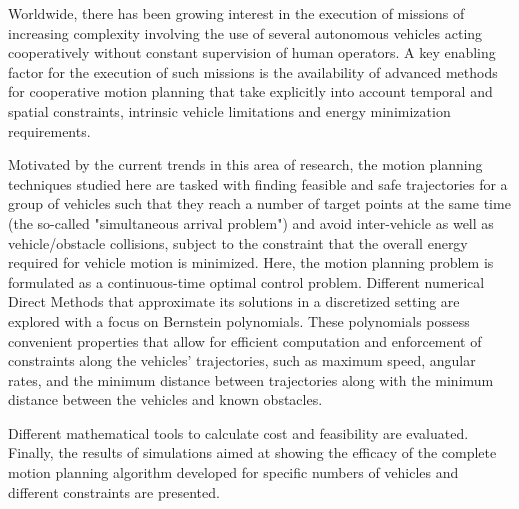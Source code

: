 \noindent

\par Worldwide, there has been growing interest in the execution of missions of increasing complexity involving the use of several autonomous vehicles acting cooperatively without constant supervision of human operators. A key enabling factor for the execution of such missions is the availability of advanced methods for cooperative motion planning that take explicitly into account temporal and spatial constraints, intrinsic vehicle limitations and energy minimization requirements.
\par Motivated by the current trends in this area of research, the motion planning techniques studied here are tasked with finding feasible and safe trajectories for a group of vehicles such that they reach a number of target points at the same time (the so-called "simultaneous arrival problem") and avoid inter-vehicle as well as vehicle/obstacle collisions, subject to the constraint that the overall energy required for vehicle motion is minimized.
Here, the motion planning problem is formulated as a continuous-time optimal control problem. Different numerical Direct Methods that approximate its solutions in a discretized setting are explored with a focus on Bernstein polynomials. These polynomials possess convenient properties that allow for efficient computation and enforcement of constraints along the vehicles’ trajectories, such as maximum speed, angular rates, and the minimum distance between trajectories along with the minimum distance between the vehicles and known obstacles.
\par Different mathematical tools to calculate cost and feasibility are evaluated. Finally, the results of simulations aimed at showing the efficacy of the complete motion planning algorithm developed for specific numbers of vehicles and different constraints are presented.